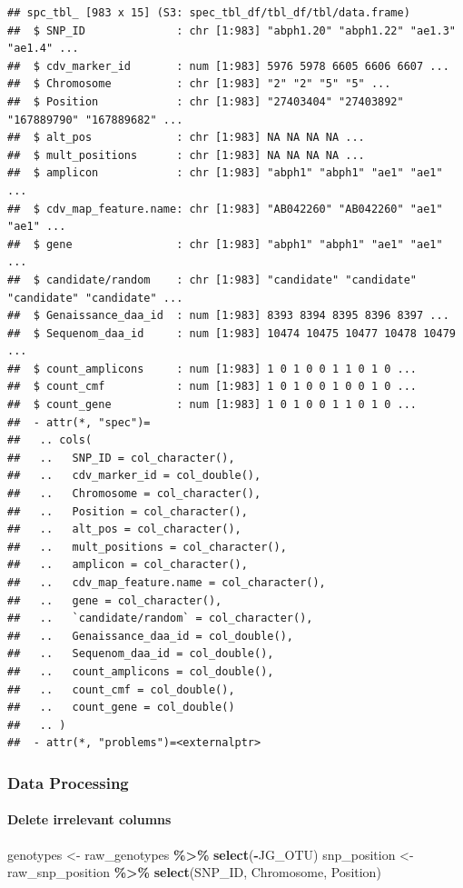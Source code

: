 \documentclass[
]{article}
\newenvironment{Shaded}{\begin{snugshade}}{\end{snugshade}}
\newcommand{\FunctionTok}[1]{\textcolor[rgb]{0.13,0.29,0.53}{\textbf{#1}}}
\newcommand{\NormalTok}[1]{#1}
\newcommand{\OtherTok}[1]{\textcolor[rgb]{0.56,0.35,0.01}{#1}}
\newcommand{\SpecialCharTok}[1]{\textcolor[rgb]{0.81,0.36,0.00}{\textbf{#1}}}
\begin{document}
\begin{verbatim}
## spc_tbl_ [983 x 15] (S3: spec_tbl_df/tbl_df/tbl/data.frame)
##  $ SNP_ID              : chr [1:983] "abph1.20" "abph1.22" "ae1.3" "ae1.4" ...
##  $ cdv_marker_id       : num [1:983] 5976 5978 6605 6606 6607 ...
##  $ Chromosome          : chr [1:983] "2" "2" "5" "5" ...
##  $ Position            : chr [1:983] "27403404" "27403892" "167889790" "167889682" ...
##  $ alt_pos             : chr [1:983] NA NA NA NA ...
##  $ mult_positions      : chr [1:983] NA NA NA NA ...
##  $ amplicon            : chr [1:983] "abph1" "abph1" "ae1" "ae1" ...
##  $ cdv_map_feature.name: chr [1:983] "AB042260" "AB042260" "ae1" "ae1" ...
##  $ gene                : chr [1:983] "abph1" "abph1" "ae1" "ae1" ...
##  $ candidate/random    : chr [1:983] "candidate" "candidate" "candidate" "candidate" ...
##  $ Genaissance_daa_id  : num [1:983] 8393 8394 8395 8396 8397 ...
##  $ Sequenom_daa_id     : num [1:983] 10474 10475 10477 10478 10479 ...
##  $ count_amplicons     : num [1:983] 1 0 1 0 0 1 1 0 1 0 ...
##  $ count_cmf           : num [1:983] 1 0 1 0 0 1 0 0 1 0 ...
##  $ count_gene          : num [1:983] 1 0 1 0 0 1 1 0 1 0 ...
##  - attr(*, "spec")=
##   .. cols(
##   ..   SNP_ID = col_character(),
##   ..   cdv_marker_id = col_double(),
##   ..   Chromosome = col_character(),
##   ..   Position = col_character(),
##   ..   alt_pos = col_character(),
##   ..   mult_positions = col_character(),
##   ..   amplicon = col_character(),
##   ..   cdv_map_feature.name = col_character(),
##   ..   gene = col_character(),
##   ..   `candidate/random` = col_character(),
##   ..   Genaissance_daa_id = col_double(),
##   ..   Sequenom_daa_id = col_double(),
##   ..   count_amplicons = col_double(),
##   ..   count_cmf = col_double(),
##   ..   count_gene = col_double()
##   .. )
##  - attr(*, "problems")=<externalptr>
\end{verbatim}

\subsubsection{Data Processing}\label{data-processing}

\paragraph{Delete irrelevant columns}\label{delete-irrelevant-columns}

\begin{Shaded}
\begin{Highlighting}[]
\NormalTok{genotypes }\OtherTok{\textless{}{-}}\NormalTok{ raw\_genotypes }\SpecialCharTok{\%\textgreater{}\%} \FunctionTok{select}\NormalTok{(}\SpecialCharTok{{-}}\NormalTok{JG\_OTU)}
\NormalTok{snp\_position }\OtherTok{\textless{}{-}}\NormalTok{ raw\_snp\_position }\SpecialCharTok{\%\textgreater{}\%} \FunctionTok{select}\NormalTok{(SNP\_ID, Chromosome, Position)}
\end{Highlighting}
\end{Shaded}
\end{document}
